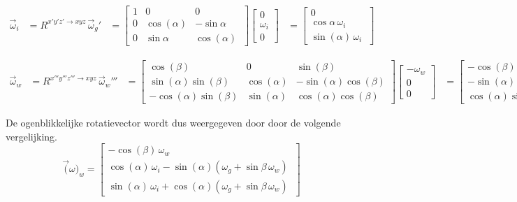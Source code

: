 \begin{equation*}
\begin{split}
\overrightarrow{\omega}_{i}
&=R^{x'y'z' \rightarrow xyz}\,\overrightarrow{\omega}_{g}'
&=	  \begin{bmatrix}
      1 & 0 & 0\\
      0 & \cos(\alpha) & -\sin{\alpha}\\ 
      0 & \sin{\alpha} & \cos(\alpha)\
      \end{bmatrix}
      \begin{bmatrix}
      0\\
      \omega_{i}\\
      0\
      \end{bmatrix}     
&=	  \begin{bmatrix}
      0\\
      \cos{\alpha}\,\omega_{i}\\
      \sin(\alpha)\,\omega_{i}\
      \end{bmatrix}
\end{split}
\end{equation*}

\begin{equation*}
\begin{split}
\overrightarrow{\omega}_{w}
&=R^{x'''y'''z''' \rightarrow xyz}\,\overrightarrow{\omega}_{w}'''
&=	  \begin{bmatrix}
      \cos(\beta) & 0 & \sin(\beta)\\
      \sin(\alpha)\sin(\beta) & \cos(\alpha) & -\sin(\alpha)\cos(\beta)\\
      -\cos(\alpha)\sin(\beta) & \sin(\alpha) & \cos(\alpha)\cos(\beta)\  
      \end{bmatrix}
      \begin{bmatrix}
      -\omega_{w}\\
      0\\
      0\
      \end{bmatrix}
&=    \begin{bmatrix}
      -\cos(\beta)\,\omega_{w}\\
      -\sin(\alpha)\sin(\beta)\,\omega_{w}\\
      \cos(\alpha)\sin(\beta)\,\omega_{w}\
      \end{bmatrix}
\end{split}
\end{equation*}

De ogenblikkelijke rotatievector wordt dus weergegeven door door de volgende vergelijking.
\begin{equation*}
\overrightarrow(\omega)_{w}=
\begin{bmatrix}
	-\cos(\beta)\,\omega_{w}\\
	\cos(\alpha)\,\omega_{i} - \sin(\alpha)(\omega_{g}+\sin{\beta}\,\omega_{w})\\
	\sin(\alpha)\,\omega_{i} + \cos(\alpha)(\omega_{g}+\sin{\beta}\,\omega_{w})\
\end{bmatrix}
\end{equation*}

